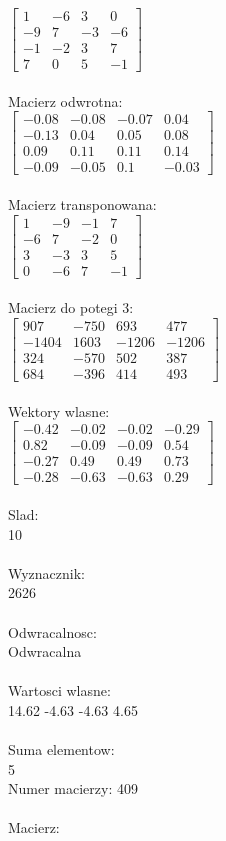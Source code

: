 \documentclass[a4paper,12pt]{article}
\begin{document}
$\begin{bmatrix} 1&-6&3&0\\-9&7&-3&-6\\-1&-2&3&7\\7&0&5&-1 \end{bmatrix}$
\\
\\
Macierz odwrotna:\\

$\begin{bmatrix} -0.08&-0.08&-0.07&0.04\\-0.13&0.04&0.05&0.08\\0.09&0.11&0.11&0.14\\-0.09&-0.05&0.1&-0.03 \end{bmatrix}$
\\
\\
Macierz transponowana:\\

$\begin{bmatrix} 1&-9&-1&7\\-6&7&-2&0\\3&-3&3&5\\0&-6&7&-1 \end{bmatrix}$
\\
\\
Macierz do potegi 3:\\

$\begin{bmatrix} 907&-750&693&477\\-1404&1603&-1206&-1206\\324&-570&502&387\\684&-396&414&493 \end{bmatrix}$
\\
\\
Wektory wlasne:\\

$\begin{bmatrix} -0.42&-0.02&-0.02&-0.29\\0.82&-0.09&-0.09&0.54\\-0.27&0.49&0.49&0.73\\-0.28&-0.63&-0.63&0.29 \end{bmatrix}$
\\
\\
Slad:\\
10
\\
\\
Wyznacznik:\\
2626
\\
\\
Odwracalnosc:\\
Odwracalna
\\
\\
Wartosci wlasne:\\
14.62 -4.63 -4.63 4.65
\\
\\
Suma elementow:\\
5
\\
\newpage
Numer macierzy:
409
\\
\\
Macierz:\\
\end{document}
